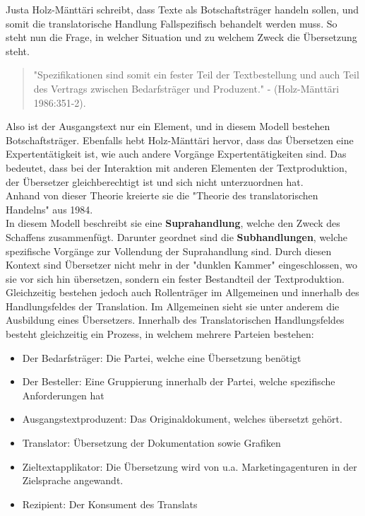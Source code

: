 \documentclass{article}
\begin{document}
	Justa Holz-Mänttäri schreibt, dass Texte als Botschaftsträger handeln sollen, und somit die translatorische Handlung Fallspezifisch behandelt werden muss. So steht nun die Frage, in welcher Situation und zu welchem Zweck die Übersetzung steht. 
	\begin{quote}
	"Spezifikationen sind somit ein fester Teil der Textbestellung und auch Teil des Vertrags zwischen Bedarfsträger und Produzent." - (Holz-Mänttäri 1986:351-2).
	\end{quote}
	Also ist der Ausgangstext nur ein Element, und in diesem Modell bestehen Botschaftsträger. Ebenfalls hebt Holz-Mänttäri hervor, dass das Übersetzen eine Expertentätigkeit ist, wie auch andere Vorgänge Expertentätigkeiten sind. Das bedeutet, dass bei der Interaktion mit anderen Elementen der Textproduktion, der Übersetzer gleichberechtigt ist und sich nicht unterzuordnen hat. \\
	Anhand von dieser Theorie kreierte sie die "Theorie des translatorischen Handelns" aus 1984. \\
	In diesem Modell beschreibt sie eine \textbf{Suprahandlung}, welche den Zweck des Schaffens zusammenfügt. Darunter geordnet sind die \textbf{Subhandlungen}, welche spezifische Vorgänge zur Vollendung der Suprahandlung sind. Durch diesen Kontext sind Übersetzer nicht mehr in der "dunklen Kammer" eingeschlossen, wo sie vor sich hin übersetzen, sondern ein fester Bestandteil der Textproduktion. \\
	Gleichzeitig bestehen jedoch auch Rollenträger im Allgemeinen und innerhalb des Handlungsfeldes der Translation. Im Allgemeinen sieht sie unter anderem die Ausbildung eines Übersetzers. Innerhalb des Translatorischen Handlungsfeldes besteht gleichzeitig ein Prozess, in welchem mehrere Parteien bestehen:
	\begin{itemize}
		\item{Der Bedarfsträger: Die Partei, welche eine Übersetzung benötigt}
		\item{Der Besteller: Eine Gruppierung innerhalb der Partei, welche spezifische Anforderungen hat}
		\item{Ausgangstextproduzent: Das Originaldokument, welches übersetzt gehört.}
		\item{Translator: Übersetzung der Dokumentation sowie Grafiken}
		\item{Zieltextapplikator: Die Übersetzung wird von u.a. Marketingagenturen in der Zielsprache angewandt.}
		\item{Rezipient: Der Konsument des Translats}
	\end{itemize}
\end{document}
